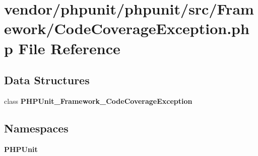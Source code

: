 \section{vendor/phpunit/phpunit/src/\+Framework/\+Code\+Coverage\+Exception.php File Reference}
\label{_code_coverage_exception_8php}
\subsection*{Data Structures}
\begin{DoxyCompactItemize}
\item 
class {\bf P\+H\+P\+Unit\+\_\+\+Framework\+\_\+\+Code\+Coverage\+Exception}
\end{DoxyCompactItemize}
\subsection*{Namespaces}
\begin{DoxyCompactItemize}
\item 
 {\bf P\+H\+P\+Unit}
\end{DoxyCompactItemize}
